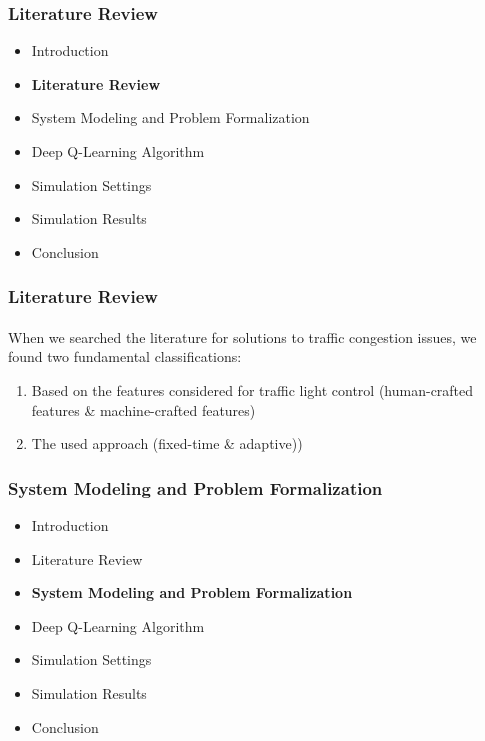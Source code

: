 \documentclass[aspectratio=169]{beamer}
\begin{document}
\begin{frame}
\frametitle{Literature Review}
\begin{itemize}
  \item  Introduction
  \item {\color{cor1}\textbf{Literature Review}}
  \item System Modeling and Problem Formalization
  \item Deep Q-Learning Algorithm
  \item Simulation Settings
  \item Simulation Results
  \item Conclusion
\end{itemize}

\end{frame}
\begin{frame}
\frametitle{Literature Review}
\framesubtitle{}

When we searched the literature for solutions to traffic
congestion issues, we found two fundamental classifications:
\begin{enumerate}
    \item Based on the features considered for traffic light control (human-crafted features \& machine-crafted features)
    \item The used approach (fixed-time \& adaptive))
\end{enumerate}
\end{frame}
\begin{frame}
\frametitle{System Modeling and Problem Formalization}
\begin{itemize}
  \item  Introduction
  \item Literature Review
  \item {\color{cor1}\textbf{System Modeling and Problem Formalization}}
  \item Deep Q-Learning Algorithm
  \item Simulation Settings
  \item Simulation Results
  \item Conclusion
\end{itemize}

\end{frame}
\end{document}
